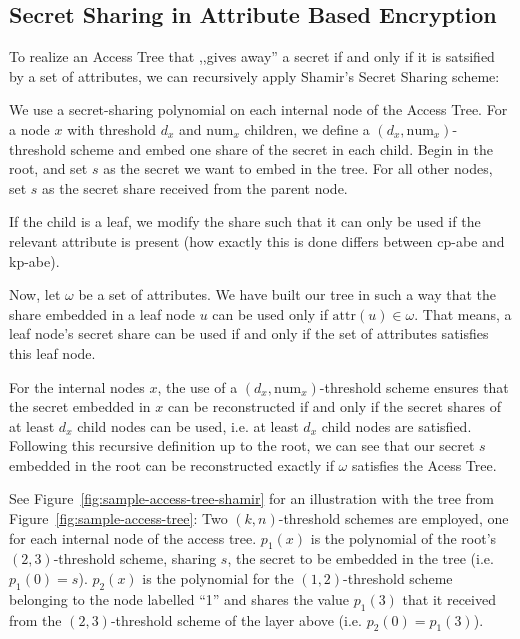 \subsection{Secret Sharing in Attribute Based Encryption}\label{sec:lss-in-access-trees}
To realize an Access Tree that ,,gives away'' a secret if and only if it is satsified by a set of attributes, we can recursively apply Shamir's Secret Sharing scheme:



We use a secret-sharing polynomial on each internal node of the Access Tree.
For a node $x$ with threshold $d_x$ and $\text{num}_x$ children, we define a $(d_x, \text{num}_x)$-threshold scheme and embed one share of the secret in each child.
Begin in the root, and set $s$ as the secret we want to embed in the tree. For all other nodes, set $s$ as the secret share received from the parent node.

If the child is a leaf, we modify the share such that it can only be used if the relevant attribute is present (how exactly this is done differs between \acrshort{cp-abe} and \acrshort{kp-abe}).

Now, let $\omega$ be a set of attributes.
We have built our tree in such a way that the share embedded in a leaf node $u$ can be used only if $\text{attr}(u) \in \omega$.
That means, a leaf node's secret share can be used if and only if the set of attributes satisfies this leaf node.

For the internal nodes $x$, the use of a $(d_x, \text{num}_x)$-threshold scheme ensures that the secret embedded in $x$ can be reconstructed if and only if the secret shares of at least $d_x$ child nodes can be used, i.e. at least $d_x$ child nodes are satisfied.
Following this recursive definition up to the root, we can see that our secret $s$ embedded in the root can be reconstructed exactly if $\omega$ satisfies the Acess Tree.

See Figure~\ref{fig:sample-access-tree-shamir} for an illustration with the tree from Figure~\ref{fig:sample-access-tree}:
Two $(k,n)$-threshold schemes are employed, one for each internal node of the access tree.
$p_1(x)$ is the polynomial of the root's $(2,3)$-threshold scheme, sharing $s$, the secret to be embedded in the tree (i.e. $p_1(0) = s$).
$p_2(x)$ is the polynomial for the $(1,2)$-threshold scheme belonging to the node labelled ``1'' and shares the value $p_1(3)$ that it received from the $(2,3)$-threshold scheme of the layer above (i.e. $p_2(0) = p_1(3)$).

